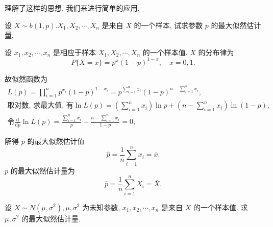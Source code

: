 理解了这样的思想, 我们来进行简单的应用. 

\begin{example}
    设 $X \sim b(1, p) . X_1, X_2, \cdots, X_n$ 是来自 $X$ 的一个样本, 试求参数 $p$ 的最大似然估计量.
\end{example}

\begin{solution}
    设 $x_1, x_2, \cdots, x_n$ 是相应于样本 $X_1, X_2, \cdots, X_n$ 的一个样本值. $X$ 的分布律为
$$
P\{X=x\}=p^x(1-p)^{1-x}, \quad x=0,1 .
$$

故似然函数为
$$
\begin{gathered}
L(p)=\prod_{i=1}^n p^{x_i}(1-p)^{1-x_i}=p^{\sum_{i=1}^n x_i}(1-p)^{n-\sum_{i=1}^n x_i}, \\
\text{取对数, 求最大值, 有}\ln L(p)=\left(\sum_{i=1}^n x_i\right) \ln p+\left(n-\sum_{i=1}^n x_i\right) \ln (1-p), \\
\text{令}\frac{\mathrm{d}}{\mathrm{d} p} \ln L(p)=\frac{\sum_{i=1}^n x_i}{p}-\frac{n-\sum_{i=1}^n x_i}{1-p}=0,
\end{gathered}
$$

解得 $p$ 的最大似然估计值
$$
\hat{p}=\frac{1}{n} \sum_{i=1}^n x_i=\bar{x} .
$$
$p$ 的最大似然估计量为
$$
\hat{p}=\frac{1}{n} \sum_{i=1}^n X_i=\bar{X} .
$$
\end{solution}

\begin{example}
    设 $X \sim N\left(\mu, \sigma^2\right), \mu, \sigma^2$ 为未知参数, $x_1, x_2, \cdots, x_n$ 是来自 $X$ 的一个样本值. 求 $\mu, \sigma^2$ 的最大似然估计量.
\end{example}

